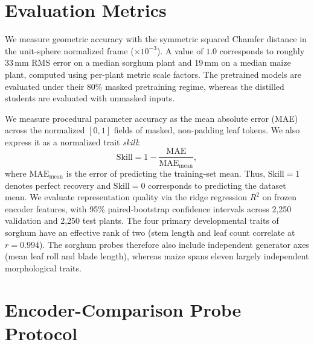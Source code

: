 \documentclass[10pt,twocolumn,letterpaper]{article}
\begin{document}
\section{Evaluation Metrics}
\label{app:metrics}

We measure geometric accuracy with the symmetric squared Chamfer distance in the unit-sphere normalized frame ($\times 10^{-3}$). A value of $1.0$ corresponds to roughly 33\,mm RMS error on a median sorghum plant and 19\,mm on a median maize plant, computed using per-plant metric scale factors. The pretrained models are evaluated under their 80\% masked pretraining regime, whereas the distilled students are evaluated with unmasked inputs.

We measure procedural parameter accuracy as the mean absolute error (MAE) across the normalized $[0,1]$ fields of masked, non-padding leaf tokens. We also express it as a normalized trait \emph{skill}:
\begin{equation}
  \mathrm{Skill} = 1 - \frac{\mathrm{MAE}}{\mathrm{MAE}_{\text{mean}}},
  \label{eq:trait-skill}
\end{equation}
where $\mathrm{MAE}_{\text{mean}}$ is the error of predicting the training-set mean. Thus, $\mathrm{Skill} = 1$ denotes perfect recovery and $\mathrm{Skill} = 0$ corresponds to predicting the dataset mean. We evaluate representation quality via the ridge regression $R^2$ on frozen encoder features, with 95\% paired-bootstrap confidence intervals across 2{,}250 validation and 2{,}250 test plants. The four primary developmental traits of sorghum have an effective rank of two (stem length and leaf count correlate at $r = 0.994$). The sorghum probes therefore also include independent generator axes (mean leaf roll and blade length), whereas maize spans eleven largely independent morphological traits.

\section{Encoder-Comparison Probe Protocol}
\label{app:probe}
\end{document}
